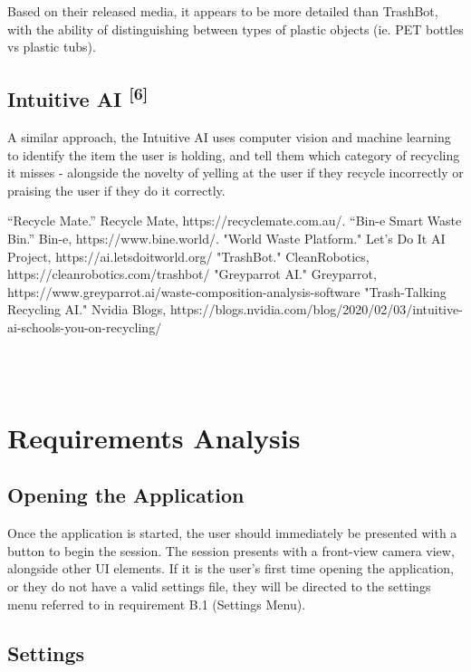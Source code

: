 \documentclass[conference]{IEEEtran}
\begin{document}
Based on their released media, it appears to be more detailed than TrashBot, with the ability of distinguishing between types of plastic objects (ie. PET bottles vs plastic tubs).
\newline

\subsection{Intuitive AI \textsuperscript{[6]}}

A similar approach, the Intuitive AI uses computer vision and machine learning to identify the item the user is holding, and tell them which category of recycling it misses - alongside the novelty of yelling at the user if they recycle incorrectly or praising the user if they do it correctly.
\newline

\begin{thebibliography}{00}
 “Recycle Mate.” Recycle Mate, https://recyclemate.com.au/. 
 “Bin-e Smart Waste Bin.” Bin-e, https://www.bine.world/. 
 "World Waste Platform." Let's Do It AI Project, https://ai.letsdoitworld.org/
 "TrashBot." CleanRobotics, https://cleanrobotics.com/trashbot/
 "Greyparrot AI." Greyparrot, https://www.greyparrot.ai/waste-composition-analysis-software
 "Trash-Talking Recycling AI." Nvidia Blogs, https://blogs.nvidia.com/blog/2020/02/03/intuitive-ai-schools-you-on-recycling/
\end{thebibliography}~\\~\\

\section{Requirements Analysis}

\subsection{Opening the Application}
Once the application is started, the user should immediately be presented with a button to begin the session. The session presents with a front-view camera view, alongside other UI elements. If it is the user's first time opening the application, or they do not have a valid settings file, they will be directed to the settings menu referred to in requirement B.1 (Settings Menu).
\newline
\subsection {Settings}
\end{document}
